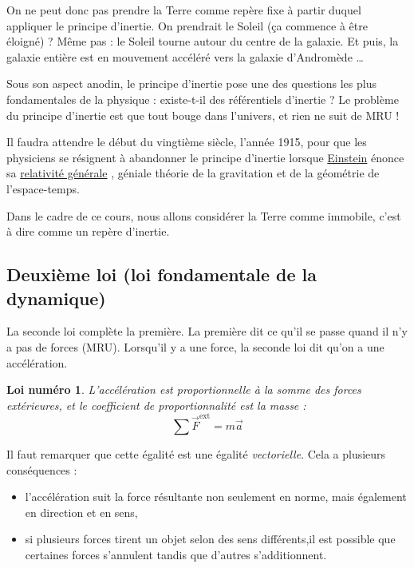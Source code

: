 \documentclass[a4paper,12pt]{book}
\newcounter{numloiphyz}
\theoremstyle{mes_exemples}	\newtheorem{exemple}[numtho]{Exemple}
\theoremstyle{mes_tho}
\newtheorem{loiphyz}[numloiphyz]{Loi numéro}
\newcommand{\fF}{\overrightarrow{F}}
\begin{document}
On ne peut donc pas prendre la Terre comme repère fixe à partir duquel appliquer le principe d'inertie. On prendrait le Soleil (ça commence à être éloigné) ? Même pas : le Soleil tourne autour du centre de la galaxie. Et puis, la galaxie entière est en mouvement accéléré vers la galaxie d'Andromède \ldots

Sous son aspect anodin, le principe d'inertie pose une des questions les plus fondamentales de la physique : existe-t-il des référentiels d'inertie ? Le problème du principe d'inertie est que tout bouge dans l'univers, et rien ne suit de MRU !

 Il faudra attendre le début du vingtième siècle, l'année 1915, pour que les physiciens se résignent à abandonner le principe d'inertie lorsque \href{http://fr.wikipedia.org/wiki/Einstein}{Einstein} énonce sa \href{http://fr.wikipedia.org/wiki/Relativité\_générale}{relativité générale} , géniale théorie de la gravitation et de la géométrie de l'espace-temps.

Dans le cadre de ce cours, nous allons considérer la Terre comme immobile, c'est à dire comme un repère d'inertie.

\subsection{Deuxième loi (loi fondamentale de la dynamique)}

La seconde loi complète la première. La première dit ce qu'il se passe quand il n'y a pas de forces (MRU). Lorsqu'il y a une force, la seconde loi dit qu'on a une accélération.

\begin{loiphyz}
L'accélération est proportionnelle à la somme des forces extérieures, et le coefficient de proportionnalité est la masse :
\begin{equation}
  \sum\fF^{\mathrm{ext}}=m\overrightarrow{a}
\end{equation}
\end{loiphyz}
Il faut remarquer que cette égalité est une égalité \emph{vectorielle}. Cela a plusieurs conséquences :
\begin{itemize}
\item l'accélération suit la force résultante non seulement en norme, mais également en direction et en sens,
\item si plusieurs forces tirent un objet selon des sens différents,il est possible que certaines forces s'annulent tandis que d'autres s'additionnent.
\end{itemize}
\end{document}
